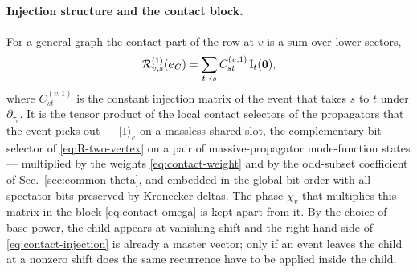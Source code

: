 \documentclass[11pt,a4paper]{article}
\newcommand{\cR}{\mathcal R}
\begin{document}
\paragraph{Injection structure and the contact block.}
For a general graph the contact part of the row at $v$ is a sum over lower sectors,
\begin{equation}
  \cR^{(1)}_{v,s}(\bm e_C)=\sum_{t\prec s}C^{(v,1)}_{st}\,\bm{\text I}_t(\bm 0),
  \label{eq:contact-injection}
\end{equation}
where $C^{(v,1)}_{st}$ is the constant injection matrix of the event that takes $s$ to $t$ under
$\partial_{\tau_v}$. It is the tensor product of the local contact selectors of the propagators that
the event picks out --- $|1\rangle_e$ on a massless shared slot, the complementary-bit selector of
\eqref{eq:R-two-vertex} on a pair of massive-propagator mode-function states --- multiplied by the
weights \eqref{eq:contact-weight} and by the odd-subset coefficient of Sec.~\ref{sec:common-theta},
and embedded in the global bit order with all spectator bits preserved by Kronecker deltas. The phase
$\chi_v$ that multiplies this matrix in the block \eqref{eq:contact-omega} is kept apart from it. By the
choice of base power, the child appears at vanishing shift and the right-hand side of
\eqref{eq:contact-injection} is already a master vector; only if an event leaves the child at a
nonzero shift does the same recurrence have to be applied inside the child.
\end{document}
